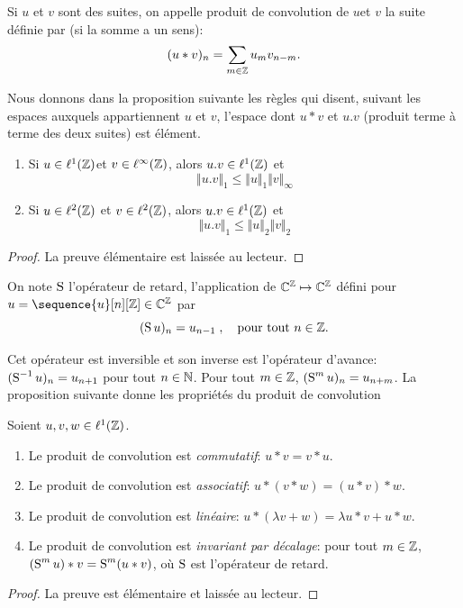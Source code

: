 \begin{definition}
Si $u$ et $v$ sont des suites, on appelle produit de convolution de $u$et $v$ la suite d\'{e}finie par (si la somme a un sens):
$$
(u*v)_{n}=\sum_{m\in \mathbb{Z}}u_{m}v_{n-m}.
$$
\end{definition}
Nous donnons dans la proposition suivante les r\`{e}gles qui disent, suivant les espaces auxquels appartiennent $u$ et $v$, l'espace dont  $u*v$ et $u.v$ (produit terme \`{a} terme des deux suites) est \'el\'ement.

\begin{lemma}
\begin{enumerate}
\item Si $u\in \ell^1(\mathbb{Z})$et $v\in \ell^\infty(\mathbb{Z})$, alors $u.v\in \ell^1(\mathbb{Z})$ et
$$
\Vert u.v\Vert_{1}\leq\Vert u\Vert_{1}\Vert v\Vert_{\infty}
$$
\item Si $u\in \ell^2(\mathbb{Z})$ et $v\in \ell^2(\mathbb{Z})$, alors $u.v\in \ell^1(\mathbb{Z})$ et
$$
\Vert u.v\Vert_{1}\leq\Vert u\Vert_{2}\Vert v\Vert_{2}
$$
\end{enumerate}
\end{lemma}
\begin{proof}
La preuve \'el\'ementaire est laiss\'ee au lecteur.
\end{proof}

\begin{definition}
\label{def:operateur-decalage}
On note $\operatorname{S}$ l'op\'erateur de retard, l'application de $\mathbb{C}^{\mathbb{Z}} \mapsto \mathbb{C}^{\mathbb{Z}}$ défini pour  $u= \sequence{u}[n][\zset] \in \cset^{\zset}$ par
\begin{equation}
\label{eq:operateur-avance}
(\operatorname{S} u)_n = u_{n-1} \;, \quad \text{pour tout $n \in \mathbb{Z}$}.
\end{equation}
\end{definition}
Cet opérateur est inversible et son inverse est l'opérateur d'avance: $(\operatorname{S}^{-1} u)_n= u_{n+1}$ pour tout $n \in \mathbb{N}$.
Pour tout $m \in \mathbb{Z}$, $(\operatorname{S}^m u)_n= u_{n+m}$.
La proposition suivante donne les propriétés du produit de convolution
\begin{proposition}
\label{prop:propriete-convolution}
Soient $u, v, w \in \ell^1(\mathbb{Z})$.
\begin{enumerate}[label=(\roman*)]
\item Le produit de convolution est \emph{commutatif}: $u * v= v * u$.
\item Le produit de convolution est \emph{associatif}: $u * (v * w)= (u * v)* w$.
\item Le produit de convolution est \emph{linéaire}: $u * (\lambda v + w)= \lambda u*v + u * w$.
\item Le produit de convolution est \emph{invariant par décalage}: pour tout $m \in \mathbb{Z}$, $(\operatorname{S}^m u) * v = \operatorname{S}^m (u * v)$, où $\operatorname{S}$ est l'opérateur de retard.
\end{enumerate}
\end{proposition}
\begin{proof}
La preuve est élémentaire et laissée au lecteur.
\end{proof}

